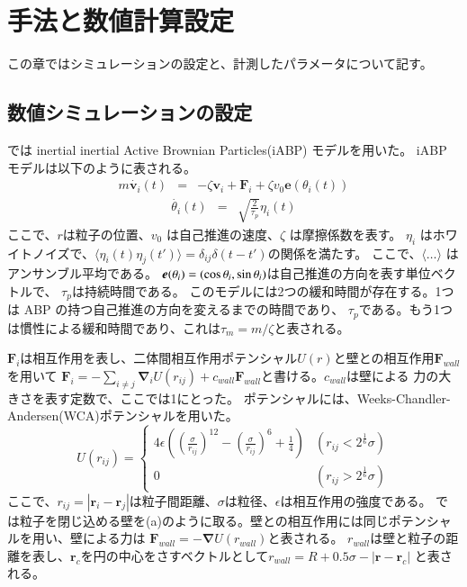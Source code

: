 \documentclass[/Users/ikedahajime/GitHub/reserch/master_report/thesis]{subfiles}
\begin{document}
\chapter{手法と数値計算設定}
この章ではシミュレーションの設定と、計測したパラメータについて記す。
\section{数値シミュレーションの設定}
では inertial inertial Active Brownian Particles(iABP) モデルを用いた。
iABP モデルは以下のように表される。
\begin{eqnarray}\label{eq:eom_iabp_1}
    m\dot{\bm{v}_i}(t)&=& - \zeta \bm{v}_i  +\bm{F}_i +\zeta v_0 \bm{e}(\theta_i(t))
\end{eqnarray}
\begin{eqnarray}\label{eq:eom_iabp_2}
    \dot{\theta_i }(t) &=& \sqrt{\frac{2}{\tau_p}}\eta_i(t)
\end{eqnarray}
ここで、\mbox{\boldmath$r$}は粒子の位置、$v_0$ は自己推進の速度、$\zeta$ は摩擦係数を表す。
$\eta_i$ はホワイトノイズで、$\langle \eta_i(t) \eta_j(t') \rangle=\delta_{ij}\delta(t-t')$の関係を満たす。
ここで、$\langle \dots \rangle$ はアンサンブル平均である。
$\mbox{\boldmath$e$}(\theta_i)=(\cos\theta_i,\sin \theta_i)$は自己推進の方向を表す単位ベクトルで、
$\tau_p$は持続時間である。
このモデルには2つの緩和時間が存在する。1つは ABP の持つ自己推進の方向を変えるまでの時間であり、
$\tau_p$である。もう1つは慣性による緩和時間であり、これは$\tau_m=m/\zeta$と表される。


$\bm{F}_i$は相互作用を表し、二体間相互作用ポテンシャル$U(r)$と壁との相互作用$\bm{F}_{wall}$を用いて
$\bm{F}_i=-\sum_{i\neq j} \bm{\nabla}_iU(r_{ij})+c_{wall}\bm{F}_{wall}$と書ける。$c_{wall}$は壁による
力の大きさを表す定数で、ここでは1にとった。
ポテンシャルには、Weeks-Chandler-Andersen(WCA)ポテンシャル\cite{weeksRoleRepulsiveForces1971}を用いた。
\begin{equation}
    U(r_{ij})=
    \begin{cases}
        4\epsilon\left(\left(\frac{\sigma}{r_{ij}}\right)^{12}-\left(\frac{\sigma}{r_{ij}}\right)^6+\frac{1}{4}\right) & (r_{ij}<2^{\frac{1}{6}}\sigma)\\
        0 &(r_{ij}>2^{\frac{1}{6}}\sigma)
    \end{cases}
\end{equation}
ここで、$r_{ij}=\left|\bm{r}_i-\bm{r}_j\right|$は粒子間距離、$\sigma$は粒径、$\epsilon$は相互作用の強度である。
では粒子を閉じ込める壁を(a)のように取る。壁との相互作用には同じポテンシャルを用い、壁による力は
$\bm{F}_{wall}=-\bm{\nabla}U(r_{wall})$と表される。
$r_{wall}$は壁と粒子の距離を表し、$\bm{r}_c$を円の中心をさすベクトルとして$r_{wall}=R+0.5\sigma-\left|\bm{r}-\bm{r}_c\right|$
と表される。
\end{document}
